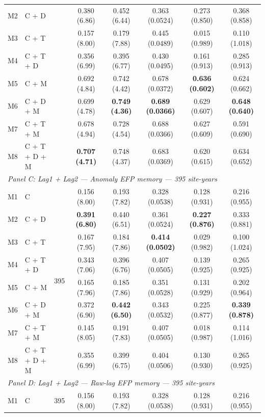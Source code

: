\begin{table}[htbp]
\begin{tabular}{llcccccc}
M2 & C + D &  & 0.380 (6.86) & 0.452 (6.44) & 0.363 (0.0524) & 0.273 (0.850) & 0.368 (0.858) \\
M3 & C + T &  & 0.157 (8.00) & 0.179 (7.88) & 0.445 (0.0489) & 0.015 (0.989) & 0.110 (1.018) \\
M4 & C + T + D &  & 0.356 (6.99) & 0.395 (6.77) & 0.430 (0.0495) & 0.161 (0.913) & 0.285 (0.913) \\
M5 & C + M &  & 0.692 (4.84) & 0.742 (4.42) & 0.678 (0.0372) & \textbf{0.636 (0.602)} & 0.624 (0.662) \\
M6 & C + D + M &  & 0.699 (4.78) & \textbf{0.749 (4.36)} & \textbf{0.689 (0.0366)} & 0.629 (0.607) & \textbf{0.648 (0.640)} \\
M7 & C + T + M &  & 0.678 (4.94) & 0.728 (4.54) & 0.688 (0.0366) & 0.627 (0.609) & 0.591 (0.690) \\
M8 & C + T + D + M &  & \textbf{0.707 (4.71)} & 0.748 (4.37) & 0.683 (0.0369) & 0.620 (0.615) & 0.634 (0.652) \\
\midrule
\multicolumn{8}{l}{\textit{Panel C: Lag1 + Lag2 --- Anomaly EFP memory --- 395 site-years}} \\
\midrule
M1 & C & \multirow{8}{*}{395} & 0.156 (8.00) & 0.193 (7.82) & 0.328 (0.0538) & 0.128 (0.931) & 0.216 (0.955) \\
M2 & C + D &  & \textbf{0.391 (6.80)} & 0.440 (6.51) & 0.361 (0.0524) & \textbf{0.227 (0.876)} & 0.333 (0.881) \\
M3 & C + T &  & 0.167 (7.95) & 0.184 (7.86) & \textbf{0.414 (0.0502)} & 0.029 (0.982) & 0.100 (1.024) \\
M4 & C + T + D &  & 0.343 (7.06) & 0.396 (6.76) & 0.407 (0.0505) & 0.139 (0.925) & 0.265 (0.925) \\
M5 & C + M &  & 0.165 (7.96) & 0.185 (7.86) & 0.351 (0.0528) & 0.131 (0.929) & 0.202 (0.964) \\
M6 & C + D + M &  & 0.372 (6.90) & \textbf{0.442 (6.50)} & 0.343 (0.0532) & 0.225 (0.877) & \textbf{0.339 (0.878)} \\
M7 & C + T + M &  & 0.145 (8.05) & 0.191 (7.83) & 0.407 (0.0505) & 0.018 (0.987) & 0.114 (1.016) \\
M8 & C + T + D + M &  & 0.355 (6.99) & 0.399 (6.75) & 0.404 (0.0506) & 0.130 (0.930) & 0.265 (0.925) \\
\midrule
\multicolumn{8}{l}{\textit{Panel D: Lag1 + Lag2 --- Raw-lag EFP memory --- 395 site-years}} \\
\midrule
M1 & C & \multirow{8}{*}{395} & 0.156 (8.00) & 0.193 (7.82) & 0.328 (0.0538) & 0.128 (0.931) & 0.216 (0.955) \\

\end{tabular}
\end{table}
